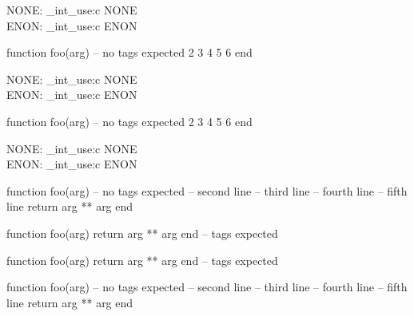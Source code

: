 \ExplSyntaxOn
NONE: \CDR_int_use:c { NONE } \\
ENON: \CDR_int_use:c { ENON } \\
\ExplSyntaxOff

\begin{CDRBlock}[
  stepnumber=1,
  firstnumber = last,
]
function foo(arg) -- no tags expected
  2
  3
  4
  5
  6
end
\end{CDRBlock}

\ExplSyntaxOn
NONE: \CDR_int_use:c { NONE } \\
ENON: \CDR_int_use:c { ENON } \\
\ExplSyntaxOff

\begin{CDRBlock}[
  stepnumber=1,
  firstnumber = auto,
]
function foo(arg) -- no tags expected
  2
  3
  4
  5
  6
end
\end{CDRBlock}
\ExplSyntaxOn
NONE: \CDR_int_use:c { NONE } \\
ENON: \CDR_int_use:c { ENON } \\
\ExplSyntaxOff

\begin{CDRBlock}[
  pygments,
  lang=lua,
  numbers=none,
  debug,
  show tags=none,
  only top=false,
]
function foo(arg) -- no tags expected
  -- second line
  -- third line
  -- fourth line
  -- fifth line
  return arg ** arg
end
\end{CDRBlock}


\begin{CDRBlock}[
  fontfamily=menlo,
  fontsize=\large,
  pygments=true,
  lang=lua,
  numbers=left,
  debug=true,
  show tags,
  only top=false
]
function foo(arg) return arg ** arg end -- tags expected
\end{CDRBlock}
\begin{CDRBlock}[
  tags={whatever it isp,we are the champions},
  fontfamily=menlo,
  fontsize=\large,
  pygments=true,
  lang=lua,
  numbers=left,
  debug=true,
  show tags,
  only top
]
function foo(arg) return arg ** arg end -- tags expected
\end{CDRBlock}
\begin{CDRBlock}[
  pygments,
  lang=lua,
  numbers=none,
  debug,
  showspaces,
  show tags=none,
  only top=false,
]
function foo(arg) -- no tags expected
  -- second line
  -- third line
  -- fourth line
  -- fifth line
  return arg ** arg
end
\end{CDRBlock}

